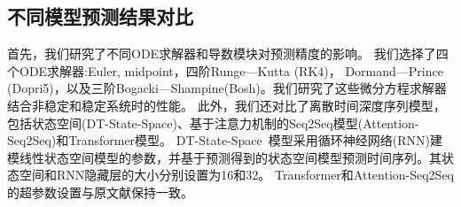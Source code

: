 \subsection{不同模型预测结果对比}
首先，我们研究了不同ODE求解器和导数模块对预测精度的影响。
我们选择了四个ODE求解器:Euler, midpoint，四阶Runge—Kutta (RK4)， Dormand—Prince (Dopri5)\cite{NIPS2018_7892}，以及三阶Bogacki—Shampine(Bosh)\cite{bogacki19893}。我们研究了这些微分方程求解器结合非稳定和稳定系统时的性能。
此外，我们还对比了离散时间深度序列模型，包括状态空间(DT-State-Space)、基于注意力机制的Seq2Seq模型(Attention-Seq2Seq)\cite{Member2019}和Transformer模型\cite{Wu2020}。
DT-State-Space~\cite{Rangapuram2018}模型采用循环神经网络(RNN)建模线性状态空间模型的参数，并基于预测得到的状态空间模型预测时间序列。其状态空间和RNN隐藏层的大小分别设置为16和32。
Transformer和Attention-Seq2Seq的超参数设置与原文献保持一致。

